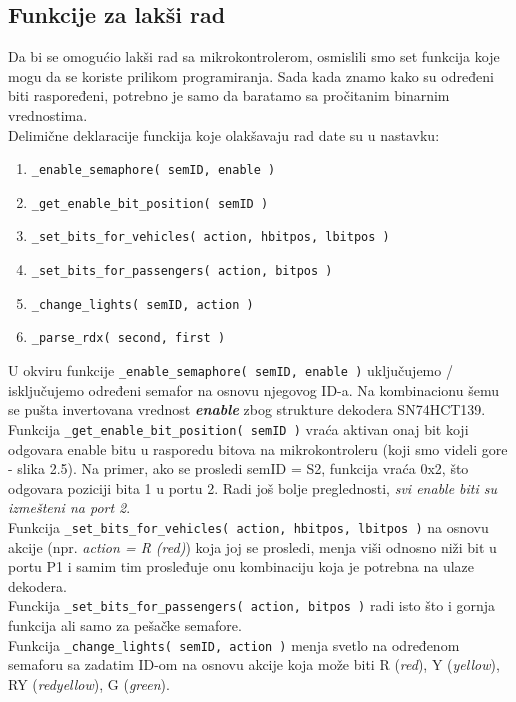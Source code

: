 \documentclass[a4paper,12pt, projekat]{etf}
\begin{document}
\subsection{Funkcije za lakši rad}
\label{title:functions}
Da bi se omogućio lakši rad sa mikrokontrolerom, osmislili smo set funkcija koje mogu da se koriste prilikom programiranja. Sada kada znamo kako su određeni biti raspoređeni, potrebno je samo da baratamo sa pročitanim binarnim vrednostima.\\
Delimične deklaracije funckija koje olakšavaju rad date su u nastavku:
\begin{enumerate}
\item \verb|_enable_semaphore( semID, enable )|
\item \verb|_get_enable_bit_position( semID )|
\item \verb|_set_bits_for_vehicles( action, hbitpos, lbitpos )|
\item \verb|_set_bits_for_passengers( action, bitpos )|
\item \verb|_change_lights( semID, action )|
\item \verb|_parse_rdx( second, first )|
\end{enumerate}

U okviru funkcije \verb|_enable_semaphore( semID, enable )| uključujemo / isključujemo određeni semafor na osnovu njegovog ID-a. Na kombinacionu šemu se pušta invertovana vrednost \textbf{\textit{enable}} zbog strukture dekodera SN74HCT139.\\

Funkcija \verb|_get_enable_bit_position( semID )| vraća aktivan onaj bit koji odgovara enable bitu u rasporedu bitova na mikrokontroleru (koji smo videli gore - slika 2.5). Na primer, ako se prosledi semID = S2, funkcija vraća 0x2, što odgovara poziciji bita 1 u portu 2. Radi još bolje preglednosti, \textit{svi enable biti su izmešteni na port 2}.\\

Funkcija \verb|_set_bits_for_vehicles( action, hbitpos, lbitpos )| na osnovu akcije (npr. \textit{action = R (\textit{red})}) koja joj se prosledi, menja viši odnosno niži bit u portu P1 i samim tim prosleđuje onu kombinaciju koja je potrebna na ulaze dekodera.\\

Funckija \verb|_set_bits_for_passengers( action, bitpos )| radi isto što i gornja funkcija ali samo za pešačke semafore.\\

Funkcija \verb|_change_lights( semID, action )| menja svetlo na određenom semaforu sa zadatim ID-om na osnovu akcije koja može biti R (\textit{red}), Y (\textit{yellow}), RY (\textit{redyellow}), G (\textit{green}).\\
\end{document}
